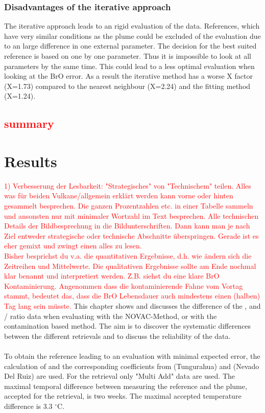 \documentclass  [
  paper    = a4,
  BCOR     = 10mm,
  twoside,
  fontsize = 12pt,
  fleqn,
  toc      = bibnumbered,
  toc      = listofnumbered,
  numbers  = noendperiod,
  headings = normal,
  listof   = leveldown,
  version  = 3.03
]                                       {scrreprt}
\begin{document}
	\subsection*{Disadvantages of the iterative approach}
	The iterative approach leads to an rigid evaluation of the data. References, which have very similar conditions as the plume could be excluded of the evaluation due to an large difference in one external parameter. The decision for the best suited reference is based on one by one parameter. Thus it is impossible to look at all parameters by the same time.   This could lead to a less optimal evaluation when looking at the BrO error.
	As a result the iterative method has a worse X factor (X=1.73) compared to the nearest neighbour (X=2.24) and the fitting method (X=1.24).
	
	
	
	\section*{\textcolor{red}{summary}}
	
	
	
	

	
	\chapter{Results}
	\textcolor{red}{1) Verbesserung der Lesbarkeit: "Strategisches" von "Technischem"
		teilen. Alles was für beiden Vulkane/allgemein erklärt werden kann vorne
		oder hinten gesammelt besprechen. Die ganzen Prozentzahlen etc. in einer
		Tabelle sammeln und ansonsten nur mit minimaler Wortzahl im Text
		besprechen. Alle technischen Details der Bildbesprechung in die
		Bildunterschriften. Dann kann man je nach Ziel entweder strategische
		oder technische Abschnitte überspringen. Gerade ist es eher gemixt und
		zwingt einen alles zu lesen.}\\
		\textcolor{red}{Bisher besprichst du v.a. die quantitativen Ergebnisse, d.h. wie
		ändern sich die Zeitreihen und Mittelwerte. Die qualitativen Ergebnisse
		sollte am Ende nochmal klar benannt und interpretiert werden. Z.B.
		siehst du eine klare BrO Kontaminierung. Angenommen dass die
		kontaminierende Fahne vom Vortag stammt, bedeutet das, dass die BrO
		Lebensdauer auch mindestens einen (halben) Tag lang sein müsste.}
	This chapter shows and discusses the difference of the ,  and /  ratio data when evaluating with the NOVAC-Method, or with the contamination based method.
	The aim is to discover the systematic differences between the different retrievals and to discuss the reliability of the data.\\
	\\
	To obtain the reference leading to an evaluation with minimal expected   error, the calculation of  and the corresponding coefficients from  (Tungurahua) and  (Nevado Del Ruiz) are used. 
	For the retrieval only "Multi Add" data are used. The maximal temporal difference between measuring the reference and the plume, accepted for the retrieval, is two weeks. The maximal accepted temperature difference is 3.3 $^{\circ}$C.\\
\end{document}
